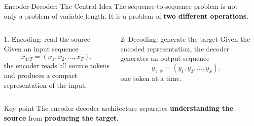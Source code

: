 \documentclass[aspectratio=169]{beamer}
\begin{document}
\begin{frame}{Encoder-Decoder: The Central Idea}
\small
The sequence-to-sequence problem is not only a problem of variable length. It is a problem of
\textbf{two different operations}.

\vspace{0.35cm}
\begin{columns}[T,onlytextwidth]
\begin{block}{1. Encoding: read the source}
Given an input sequence
\[
  x_{1:T} = (x_1,x_2,\ldots,x_T),
\]
the encoder reads all source tokens and produces a compact representation of the input.
\end{block}

\begin{block}{2. Decoding: generate the target}
Given the encoded representation, the decoder generates an output sequence
\[
  y_{1:S} = (y_1,y_2,\ldots,y_S),
\]
one token at a time.
\end{block}
\end{columns}

\vspace{0.25cm}
\begin{alertblock}{Key point}
The encoder-decoder architecture separates \textbf{understanding the source} from \textbf{producing the target}.
\end{alertblock}
\end{frame}
%
%
\end{document}
